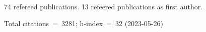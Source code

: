74 refereed publications. 13 refeered publications as first author.

Total citations~=~3281; h-index~=~32 (2023-05-26)